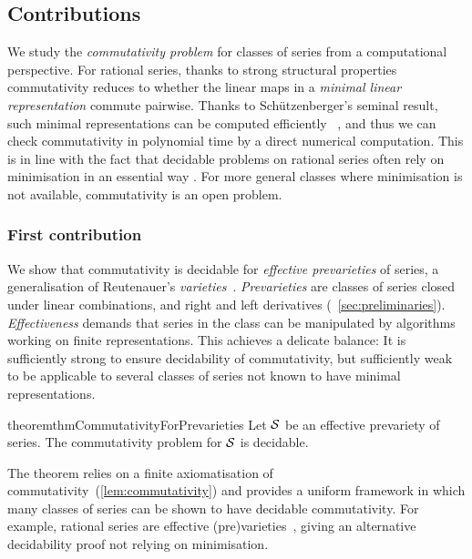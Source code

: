\subsection*{Contributions}

We study the \emph{commutativity problem} for classes of series from a computational perspective.
%
For rational series, thanks to strong structural properties~\cite[Proposition 3.1]{Fliess:1971-1972}
commutativity reduces to whether the linear maps in a \emph{minimal linear representation} commute pairwise.
%
Thanks to Schützenberger's seminal result,
such minimal representations can be computed efficiently\-
~\cite[III.B.1]{Schutzenberger:IC:1961},
and thus we can check commutativity in polynomial time by a direct numerical computation.
%
This is in line with the fact that decidable problems on rational series
often rely on minimisation in an essential way\-
\cite{BellSmertnig:LICS:2023,Kostolanyi:IC:2023,JeckerMazowieckiPurser:LICS:2024}.
%
For more general classes where minimisation is not available,
commutativity is an open problem.

\subsubsection*{First contribution}
%
We show that commutativity is decidable for \emph{effective prevarieties} of series,
a generalisation of Reutenauer's \emph{varieties}~\cite[Sec.~III.1]{Reutenauer_1980}.
%
\emph{Prevarieties} are classes of series closed under linear combinations, and right and left derivatives
(\cf~\cref{sec:preliminaries}).
%
\emph{Effectiveness} demands that series in the class can be manipulated by algorithms
working on finite representations.
%
This achieves a delicate balance:
It is sufficiently strong to ensure decidability of commutativity,
but sufficiently weak to be applicable to several classes of series
not known to have minimal representations.
%
\begin{restatable}{theorem}{thmCommutativityForPrevarieties}
    \label{thm:commutativity for effective prevarieties}
    Let $\mathcal S$ be an effective prevariety of series.
    The commutativity problem for $\mathcal S$ is decidable.
\end{restatable}
%
\noindent
The theorem relies on a finite axiomatisation of commutativity~(\cref{lem:commutativity})
and provides a uniform framework in which many classes of series can be shown to have decidable commutativity.
%
For example, rational series are effective (pre)varieties~\cite[Theorem III.1.1]{Reutenauer_1980},
giving an alternative decidability proof not relying on minimisation.


